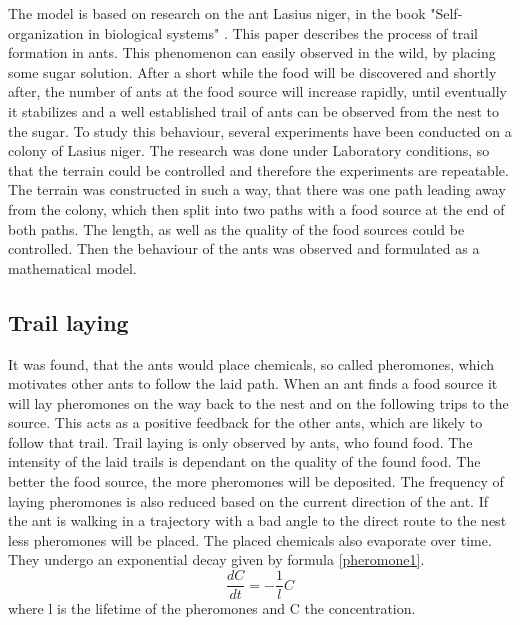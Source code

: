The model is based on research on the ant Lasius niger, in the book "Self-organization in biological systems" \citep{camazine2003}. This paper describes the process of trail formation in ants. This phenomenon can easily observed in the wild, by placing some sugar solution. After a short while the food will be discovered and shortly after, the number of ants at the food source will increase rapidly, until eventually it stabilizes and a well established trail of ants can be observed from the nest to the sugar. To study this behaviour, several experiments have been conducted on a colony of Lasius niger. The research was done under Laboratory conditions, so that the terrain could be controlled and therefore the experiments are repeatable. The terrain was constructed in such a way, that there was one path leading away from the colony, which then split into two paths with a food source at the end of both paths. The length, as well as the quality of the food sources could be controlled. Then the behaviour of the ants was observed and formulated as a mathematical model.
\subsection{Trail laying}
 It was found, that the ants would place chemicals, so called pheromones, which motivates other ants to follow the laid path. When an ant finds a food source it will lay pheromones on the way back to the nest and on the following trips to the source. This acts as a positive feedback for the other ants, which are likely to follow that trail. Trail laying is only observed by ants, who found food. The intensity of the laid trails is dependant on the quality of the found food. The better the food source, the more pheromones will be deposited. The frequency of laying pheromones is also reduced based on the current direction of the ant. If the ant is walking in a trajectory with a bad angle to the direct route to the nest less pheromones will be placed. The placed chemicals also evaporate over time. They undergo an exponential decay given by formula \ref{pheromone1}.
 \begin{equation} \label{pheromone1}
  \frac{dC}{dt}=-\frac{1}{l}C
 \end{equation}
 where l is the lifetime of the pheromones and C the concentration.
